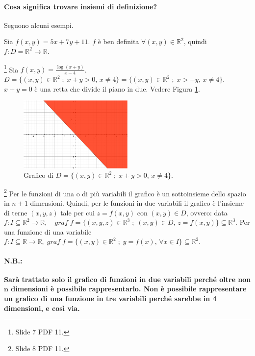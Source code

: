 \paragraph{Cosa significa trovare insiemi di definizione?} Seguono alcuni esempi.
\begin{example}
    Sia $f(x,y)=5x+7y+11$. $f$ è ben definita $\forall(x,y)\in\mathbb R^2$, quindi $f\colon D=\mathbb R^2\rightarrow \mathbb R$.
\end{example}

\begin{example}\footnote{Slide 7 PDF 11.}
    Sia $f(x,y)=\frac{\log(x+y)}{x-4}$. $D=\{(x,y)\in\mathbb R^2\;;\; x+y>0,\, x\neq 4\}=\{(x,y)\in\mathbb R^2\;;\; x>-y,\, x\neq 4\}.$ $x+y=0$ è una retta che divide il piano in due.
    Vedere Figura \ref{fig:dominio_log(x+y)_x-4}.
    \begin{figure}
    \centering
        \includegraphics[width=0.5\textwidth]{Analisi2/figures/dominio_log(x+y)_x-4.jpg}
        \caption{Grafico di $D=\{(x,y)\in\mathbb R^2\;;\; x+y>0,\, x\neq 4\}$.}\label{fig:dominio_log(x+y)_x-4}
    \end{figure}
\end{example}

\begin{remark}\footnote{Slide 8 PDF 11.}
    Per le funzioni di una o di più variabili il grafico è un sottoinsieme dello spazio in $n+1$ dimensioni. Quindi, per le funzioni in due variabili il grafico è l'insieme di terne $(x,y,z)$ tale per cui $z=f(x,y)$ con $(x,y)\in D$, ovvero: data $f\colon I\subseteq\mathbb R^2\rightarrow\mathbb R,\quad graf\;f =\{(x,y,z)\in\mathbb R^3\;;\;(x,y)\in D,\, z=f(x,y)\}\subseteq\mathbb R^3$. Per una funzione di una variabile $f\colon I\subseteq\mathbb R\rightarrow\mathbb R,\; graf\;f =\{(x,y)\in\mathbb R^2\;;\; y=f(x),\, \forall x\in I\}\subseteq\mathbb R^2$.
\end{remark}

\paragraph{N.B.:} \textbf{Sarà trattato solo il grafico di funzioni in due variabili perché oltre non $\boldsymbol n$ dimensioni è possibile rappresentarlo. Non è possibile rappresentare un grafico di una funzione in tre variabili perché sarebbe in 4 dimensioni, e così via.}


